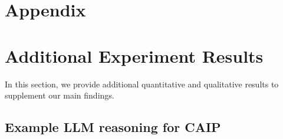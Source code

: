 



\appendix
\section*{Appendix}

\section{Additional Experiment Results}
In this section, we provide additional quantitative and qualitative results to supplement our main findings.

\subsection{Example LLM reasoning for CAIP}\label{subsec:example_llm_reasoning}
